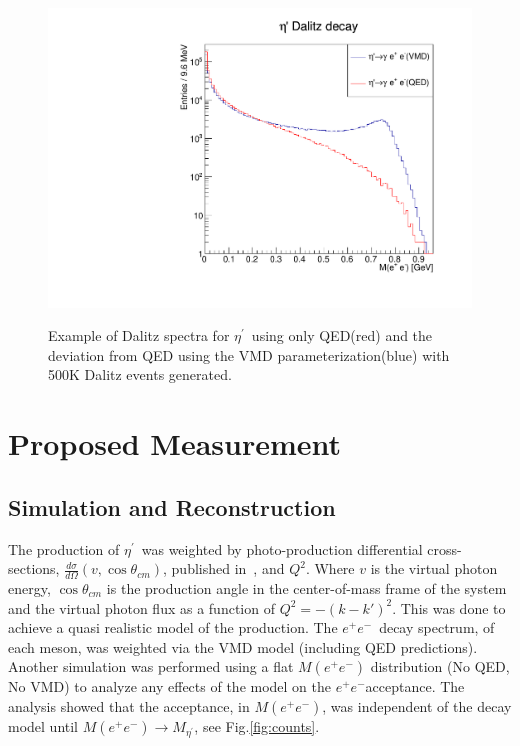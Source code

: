 \documentclass[11pt,a4paper,twocolumn]{article}
\newlength{\qfigheight}
\def\etaP{\eta^{\prime}}
\def\etaTP{$\eta^{\prime}  $}
\def\epemT{$ e^+e^-  $}
\def\epem{e^+e^-}
\begin{document}
	
	\begin{figure}[h!]\begin{center}
			\includegraphics[width=0.8\columnwidth,height=1.0\qfigheight]{figures/etaP_Dalitz_QED_FF_comparePlot.pdf}\label{fig:etap_dalitz_conpare}
			\caption[Dalitz  for \etaTP \ and $\phi$]{\label{fig:dalitz_compare}Example of Dalitz spectra for \etaTP \ using only QED(red) and the deviation from QED using the VMD parameterization(blue) with 500K Dalitz events generated. }
		\end{center}\end{figure}
	
\FloatBarrier
\section{Proposed Measurement}\label{sec:measurement}
\subsection{Simulation and Reconstruction}
\indent The production of \etaTP \ was weighted by photo-production differential cross-sections, $\frac{d\sigma}{d\Omega}(v,\cos\theta_{cm})$, published in~\cite{Williams}, and $Q^2$. Where $v$ is the virtual photon energy, $\cos\theta_{cm}$ is the production angle in the center-of-mass frame of the system and the virtual photon flux as a function of $Q^2 = -(k-k')^2$. This was done to achieve a quasi realistic model of the production. The \epemT \  decay spectrum, of each meson, was weighted via the VMD model (including QED predictions). Another simulation was performed using a flat $M(\epem)$ distribution (No QED, No VMD) to analyze any effects of the model on the \epemT acceptance. The analysis showed that the acceptance, in $M(\epem)$, was independent of the decay model until $M(\epem)\to M_{\etaP} $, see Fig.\ref{fig:counts}.
\end{document}
